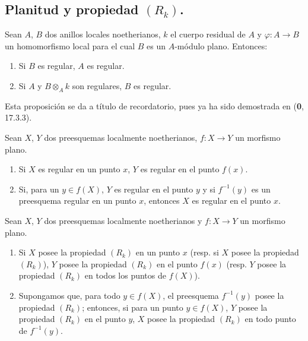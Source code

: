 
\subsection{\texorpdfstring{Planitud y propiedad $(R_k)$.}{Planitud y propiedad (R\string_k)}}

\begin{proposition}[6.5.1]
Sean $A$, $B$ dos anillos locales noetherianos, $k$ el cuerpo residual
de $A$ y $\varphi:A\to B$ un homomorfismo local para el cual $B$ es un
$A$-módulo plano. Entonces:
\begin{enumerate}
\item[\textup{(i)}] Si $B$ es regular, $A$ es regular.
\item[\textup{(ii)}] Si $A$ y $B\otimes_Ak$ son regulares, $B$ es regular.
\end{enumerate}
\end{proposition}

Esta proposición se da a título de recordatorio, pues ya ha sido demostrada en
(\textbf{0}, 17.3.3).

\begin{corollary}[6.5.2]
\label{IV.2.s6.5.2-fr}
Sean $X$, $Y$ dos preesquemas localmente noetherianos, $f:X\to Y$
un morfismo plano.
\begin{enumerate}
\item[\textup{(i)}] Si $X$ es regular en un punto $x$, $Y$ es regular en el punto
$f(x)$.
\item[\textup{(ii)}] Si, para un $y\in f(X)$, $Y$ es regular en el punto $y$ y si
$f^{-1}(y)$ es un preesquema regular en un punto $x$, entonces $X$ es
regular en el punto $x$.
\end{enumerate}
\end{corollary}

\begin{proposition}[6.5.3]
\label{IV.2.s6.5.3-fr}
Sean $X$, $Y$ dos preesquemas localmente noetherianos y $f:X\to Y$
un morfismo plano.
\begin{enumerate}
\item[\textup{(i)}] Si $X$ posee la propiedad $(R_k)$ en un punto $x$
\textup{(resp.} si $X$ posee la propiedad $(R_k)$), $Y$ posee la propiedad
$(R_k)$ en el punto $f(x)$ \textup{(resp.} $Y$ posee la propiedad $(R_k)$ en todos
los puntos de $f(X)$).
\item[\textup{(ii)}] Supongamos que, para todo $y\in f(X)$, el preesquema
$f^{-1}(y)$ posee la propiedad $(R_k)$; entonces, si para un punto
$y\in f(X)$, $Y$ posee la propiedad $(R_k)$ en el punto $y$, $X$ posee
la propiedad $(R_k)$ en todo punto de $f^{-1}(y)$.
\end{enumerate}
\end{proposition}

